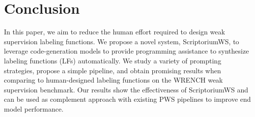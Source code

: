 \section{Conclusion}
In this paper, we aim to reduce the human effort required to design weak supervision labeling functions. We propose a novel system, ScriptoriumWS, to leverage code-generation models to provide programming assistance to synthesize labeling functions (LFs) automatically. We study a variety of prompting strategies, propose a simple pipeline, and obtain promising results when comparing to human-designed labeling functions on the WRENCH weak supervision benchmark. Our results show the effectiveness of ScriptoriumWS and can be used as complement approach with existing PWS pipelines to improve end model performance.